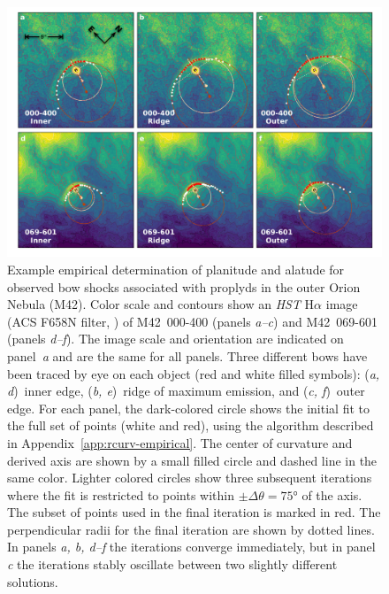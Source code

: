 \begin{figure}
  \centering
  \includegraphics[width=\linewidth]{figs/new-two-arc-multi-fig}
  \caption[]{Example empirical determination of planitude and alatude
    for observed bow shocks associated with proplyds in the outer
    Orion Nebula (M42).  Color scale and contours show an \textit{HST}
    H\(\alpha\) image (ACS F658N filter, \citealp{Bally:2006a}) of
    M42~000-400 (panels \textit{a--c}) and M42~069-601 (panels
    \textit{d--f}).  The image scale and orientation are indicated on
    panel~\textit{a} and are the same for all panels.  Three different
    bows have been traced by eye on each object (red and white filled
    symbols): (\textit{a, d})~inner edge, (\textit{b, e})~ridge of
    maximum emission, and (\textit{c, f})~outer edge.  For each panel,
    the dark-colored circle shows the initial fit to the full set of
    points (white and red), using the algorithm described in
    Appendix~\ref{app:rcurv-empirical}.  The center of curvature and
    derived axis are shown by a small filled circle and dashed line in
    the same color. Lighter colored circles show three subsequent
    iterations where the fit is restricted to points within
    \(\pm \Delta\theta = \ang{75}\) of the axis.  The subset of points used in
    the final iteration is marked in red.  The perpendicular radii for
    the final iteration are shown by dotted lines. In panels
    \textit{a, b, d--f} the iterations converge immediately, but in
    panel \textit{c} the iterations stably oscillate between two
    slightly different solutions. }
  \label{fig:000-400-fit}
\end{figure}

